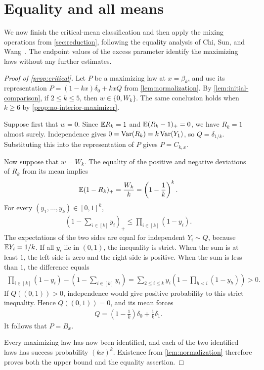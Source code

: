 \section{Equality and all means}\label{sec:equality}

We now finish the critical-mean classification and then apply the mixing operations from \cref{sec:reduction}, following the equality analysis of Chi, Sun, and Wang~\cite[Section 7]{CSW2026}. The endpoint values of the excess parameter identify the maximizing laws without any further estimates.

\begin{proof}[Proof of \cref{prop:critical}]
Let $P$ be a maximizing law at $x=\beta_k$, and use its representation $P=(1-kx)\delta_0+kxQ$ from \cref{lem:normalization}. By \cref{lem:initial-comparison}, if $2\le k\le5$, then $w\in\{0,W_k\}$. The same conclusion holds when $k\ge6$ by \cref{prop:no-interior-maximizer}.

Suppose first that $w=0$. Since $\mathbb E R_k=1$ and $\mathbb E(R_k-1)_+=0$, we have $R_k=1$ almost surely. Independence gives $0=\operatorname{Var}(R_k)=k\operatorname{Var}(Y_1)$, so $Q=\delta_{1/k}$. Substituting this into the representation of $P$ gives $P=C_{k,x}$.

Now suppose that $w=W_k$. The equality of the positive and negative deviations of $R_k$ from its mean implies
\begin{align*}
 \mathbb E(1-R_k)_+=\frac{W_k}{k}=\left(1-\frac1k\right)^k.
\end{align*}
For every $(y_1,\ldots,y_k)\in[0,1]^k$,
\begin{align*}
 \left(1-\sum_{i\in[k]}y_i\right)_+\le\prod_{i\in[k]}(1-y_i).
\end{align*}
The expectations of the two sides are equal for independent $Y_i\sim Q$, because $\mathbb E Y_i=1/k$. If all $y_i$ lie in $(0,1)$, the inequality is strict. When the sum is at least $1$, the left side is zero and the right side is positive. When the sum is less than $1$, the difference equals
\begin{align*}
 \prod_{i\in[k]}(1-y_i)-\left(1-\sum_{i\in[k]}y_i\right)
 =\sum_{2\le i\le k}y_i\left(1-\prod_{h<i}(1-y_h)\right)>0.
\end{align*}
If $Q((0,1))>0$, independence would give positive probability to this strict inequality. Hence $Q((0,1))=0$, and its mean forces
\begin{align*}
 Q=\left(1-\frac1k\right)\delta_0+\frac1k\delta_1.
\end{align*}
It follows that $P=B_x$.

Every maximizing law has now been identified, and each of the two identified laws has success probability $(kx)^k$. Existence from \cref{lem:normalization} therefore proves both the upper bound and the equality assertion.
\end{proof}


